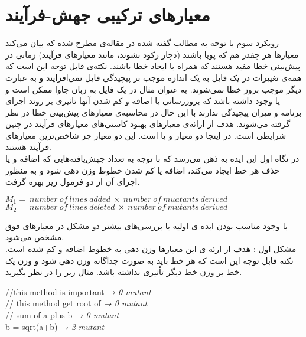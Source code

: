 \section{معیارهای ترکیبی جهش-فرآیند}
رویکرد سوم با توجه به مطالب گفته شده در مقاله‌ی \cite{rahman2013and} مطرح شده که بیان می‌کند معیارها هر چقدر هم که پویا باشند (دچار رکود نشوند، مانند معیارهای فرآیند) زمانی در پیش‌بینی خطا مفید هستند که همراه با ایجاد خطا باشند. نکته‌ی قابل توجه این است که همه‌ی تغییرات در یک فایل به یک اندازه موجب بر پیچیدگی فایل نمی‌افزایند و به عبارت دیگر موجب بروز خطا نمی‌شوند. به عنوان مثال در یک فایل به زبان جاوا ممکن است  و یا  وجود داشته باشد که بروزرسانی یا اضافه و کم شدن آنها تاثیری بر روند اجرای برنامه و میران پیچیدگی ندارند با این حال در محاسبه‌ی معیارهای پیش‌بینی خطا در نظر گرفته می‌شوند. هدف از ارائه‌ی معیارهای  بهبود کاستی‌های معیارهای فرآیند در چنین شرایطی است. در اینجا دو معیار  و یا  است.  این دو معیار جز شاخص‌ترین معیارهای فرآیند هستند.\\
در نگاه اول  این ایده به ذهن می‌رسد که با توجه به تعداد جهش‌یافته‌هایی که  اضافه  و یا حذف هر خط ایجاد می‌کند، اضافه یا کم شدن خطوط وزن دهی شود و به منظور اجرای آن از دو  فرمول زیر بهره گرفت.\\
\begin{latin}
	
	$M_1 =\ number\ of\ lines\ added\ \times \ number\ of\ muatants\ derived$\\
	
	$M_2 =\ number\ of\ lines\ deleted\ \times \ number\ of\ mutants\ derived$\\
\end{latin}


با وجود مناسب بودن ایده ی اولیه با بررسی‌های بیشتر دو مشکل در معیارهای فوق مشخص می‌شود.\\
مشکل اول : هدف از ارئه ی این معیارها وزن دهی به خطوط اضافه و کم شده است. نکته قابل توجه این است که هر خط باید به صورت جداگانه وزن دهی شود و وزن یک خط بر وزن خط دیگر تأثیری نداشته باشد. مثال زیر را در نظر بگیرید.
\begin{latin}
\flushleft
//this method is important  \emph{→ 0 mutant} \\
// this method get root of \emph{→ 0 mutant}\\
// sum of a plus b \emph{→ 0 mutant} \\ 
b = sqrt(a+b) \emph{→ 2 mutant} \\
\end{latin}

